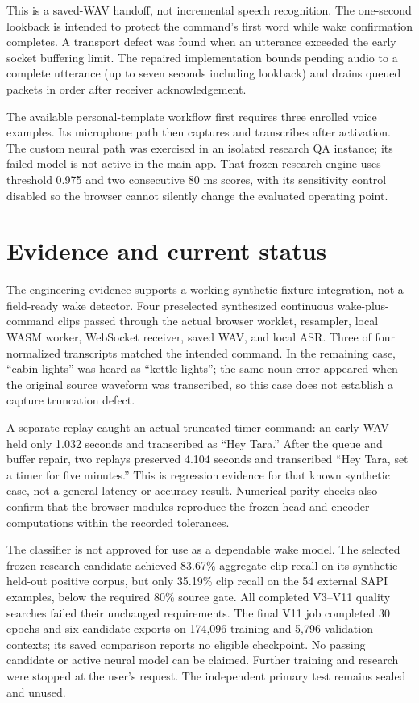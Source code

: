 \documentclass[11pt]{article}
\begin{document}
This is a saved-WAV handoff, not incremental speech recognition. The one-second lookback is intended to protect the command's first word while wake confirmation completes. A transport defect was found when an utterance exceeded the early socket buffering limit. The repaired implementation bounds pending audio to a complete utterance (up to seven seconds including lookback) and drains queued packets in order after receiver acknowledgement.

The available personal-template workflow first requires three enrolled voice examples. Its microphone path then captures and transcribes after activation. The custom neural path was exercised in an isolated research QA instance; its failed model is not active in the main app. That frozen research engine uses threshold 0.975 and two consecutive 80 ms scores, with its sensitivity control disabled so the browser cannot silently change the evaluated operating point.
\section{Evidence and current status}
The engineering evidence supports a working synthetic-fixture integration, not a field-ready wake detector. Four preselected synthesized continuous wake-plus-command clips passed through the actual browser worklet, resampler, local WASM worker, WebSocket receiver, saved WAV, and local ASR. Three of four normalized transcripts matched the intended command. In the remaining case, ``cabin lights'' was heard as ``kettle lights''; the same noun error appeared when the original source waveform was transcribed, so this case does not establish a capture truncation defect.

A separate replay caught an actual truncated timer command: an early WAV held only 1.032 seconds and transcribed as ``Hey Tara.'' After the queue and buffer repair, two replays preserved 4.104 seconds and transcribed ``Hey Tara, set a timer for five minutes.'' This is regression evidence for that known synthetic case, not a general latency or accuracy result. Numerical parity checks also confirm that the browser modules reproduce the frozen head and encoder computations within the recorded tolerances.

The classifier is not approved for use as a dependable wake model. The selected frozen research candidate achieved 83.67\% aggregate clip recall on its synthetic held-out positive corpus, but only 35.19\% clip recall on the 54 external SAPI examples, below the required 80\% source gate. All completed V3--V11 quality searches failed their unchanged requirements. The final V11 job completed 30 epochs and six candidate exports on 174,096 training and 5,796 validation contexts; its saved comparison reports no eligible checkpoint. No passing candidate or active neural model can be claimed. Further training and research were stopped at the user's request. The independent primary test remains sealed and unused.
\end{document}
